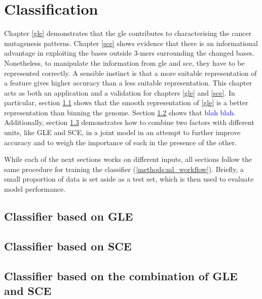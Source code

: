 \chapter{Classification}\label{ml}

Chapter \ref{gle} demonstrates that the \gls{gle} contributes to characterising the cancer mutagenesis patterns. Chapter \ref{sce} shows evidence that there is an informational advantage in exploiting the bases outside 3-mers surrounding the changed bases. Nonetheless, to manipulate the information from \gls{gle} and \gls{sce}, they have to be represented correctly. A sensible instinct is that a more suitable representation of a feature gives higher accuracy than a less suitable representation. This chapter acts as both an application and a validation for chapters \ref{gle} and \ref{sce}. In particular, section \ref{ml:gle} shows that the smooth representation of \ref{gle} is a better representation than binning the genome. Section \ref{ml:sce} shows that \textcolor{blue}{blah blah}. Additionally, section \ref{ml:both} demonstrates how to combine two factors with different units, like GLE and SCE, in a joint model in an attempt to further improve accuracy and to weigh the importance of each in the presence of the other.

While each of the next sections works on different inputs, all sections follow the same procedure for training the classifier (\ref{methods:ml_workflow}). Briefly, a small proportion of data is set aside as a test set, which is then used to evaluate model performance.

\section{Classifier based on GLE}\label{ml:gle}



\section{Classifier based on SCE}\label{ml:sce}
\section{Classifier based on the combination of GLE and SCE}\label{ml:both}